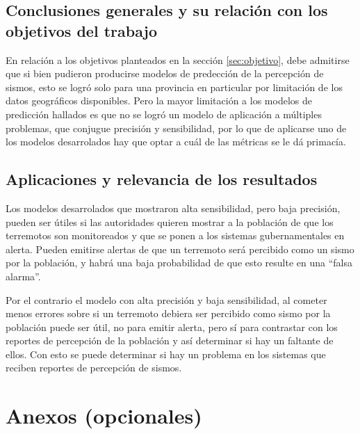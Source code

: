 \documentclass[a4paper]{report}
\begin{document}
\section{Conclusiones generales y su relación con los objetivos del trabajo}
En relación a los objetivos planteados en la sección \ref{sec:objetivo}, debe admitirse que si bien pudieron producirse modelos de predección de la percepción de sismos, esto se logró solo para una provincia en particular por limitación de los datos geográficos disponibles.
Pero la mayor limitación a los modelos de predicción hallados es que no se logró un modelo de aplicación a múltiples problemas, que conjugue precisión y sensibilidad, por lo que de aplicarse uno de los modelos desarrolados hay que optar a cuál de las métricas se le dá primacía. 



\section{Aplicaciones y relevancia de los resultados}
Los modelos desarrolados que mostraron alta sensibilidad, pero baja precisión, pueden ser útiles si las autoridades quieren mostrar a la población de que los terremotos son monitoreados y que se ponen a los sistemas gubernamentales en alerta.
Pueden emitirse alertas de que un terremoto será percibido como un sismo por la población, y habrá una baja probabilidad de que esto resulte en una ``falsa alarma''.

Por el contrario el modelo con alta precisión y baja sensibilidad, al cometer menos errores sobre si un terremoto debiera ser percibido como sismo por la población puede ser útil, no para emitir alerta, pero sí para contrastar con los reportes de percepción de la población y así determinar si hay un faltante de ellos.
Con esto se puede determinar si hay un problema en los sistemas que reciben reportes de percepción de sismos.



\printbibliography[heading=bibintoc] %



\chapter*{Anexos (opcionales)}
\end{document}
